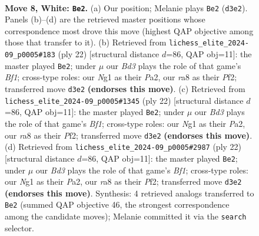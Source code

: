 \documentclass[11pt]{article}
\begin{document}
\begin{figure}[p]\centering
\begin{subfigure}{0.46\textwidth}\centering
\resizebox{\linewidth}{!}{%
\newchessgame
\chessboard[
  setfen={r1bqk2r/pp1nbppp/2p2n2/3p2B1/3P4/2NBP3/PP3PPP/R2QK1NR w KQkq - 2 8},
  showmover=false,
  pgfstyle=straightmove, color=movearrow, markmove={d3-e2}
]}
\caption{}
\end{subfigure}\hfill
\begin{subfigure}{0.46\textwidth}\centering
\resizebox{\linewidth}{!}{%
\newchessgame
\chessboard[
  setfen={2rqkb1r/1p1n1pp1/p2p1n2/3Pp2p/8/2N1B2P/PPP2PP1/R2QKB1R w KQk - 3 12},
  showmover=false,
  pgfstyle=straightmove, color=movearrow, markmove={f1-e2}
]}
\caption{}
\end{subfigure}
\\[4pt]
\begin{subfigure}{0.46\textwidth}\centering
\resizebox{\linewidth}{!}{%
\newchessgame
\chessboard[
  setfen={2rqkb1r/1p1n1pp1/p2p1n2/3Pp2p/8/2N1B2P/PPP2PP1/R2QKB1R w KQk - 3 12},
  showmover=false,
  pgfstyle=straightmove, color=movearrow, markmove={f1-e2}
]}
\caption{}
\end{subfigure}\hfill
\begin{subfigure}{0.46\textwidth}\centering
\resizebox{\linewidth}{!}{%
\newchessgame
\chessboard[
  setfen={2rqkb1r/1p1n1pp1/p2p1n2/3Pp2p/8/2N1B2P/PPP2PP1/R2QKB1R w KQk - 3 12},
  showmover=false,
  pgfstyle=straightmove, color=movearrow, markmove={f1-e2}
]}
\caption{}
\end{subfigure}
\caption{\textbf{Move 8, White: \texttt{Be2}.} (a) Our position; Melanie plays \texttt{Be2} (\texttt{d3e2}). Panels (b)--(d) are the retrieved master positions whose correspondence most drove this move (highest QAP objective among those that transfer to it). (b) Retrieved from \texttt{lichess\_elite\_2024-09\_p0005\#183} (ply 22) [structural distance $d$=86, QAP obj=11]: the master played \texttt{Be2}; under $\mu$ our \emph{Bd3} plays the role of that game's \emph{Bf1}; cross-type roles: our \emph{N}g1 as their \emph{P}a2, our \emph{r}a8 as their \emph{P}f2; transferred move \texttt{d3e2} \textbf{(endorses this move)}. (c) Retrieved from \texttt{lichess\_elite\_2024-09\_p0005\#1345} (ply 22) [structural distance $d$=86, QAP obj=11]: the master played \texttt{Be2}; under $\mu$ our \emph{Bd3} plays the role of that game's \emph{Bf1}; cross-type roles: our \emph{N}g1 as their \emph{P}a2, our \emph{r}a8 as their \emph{P}f2; transferred move \texttt{d3e2} \textbf{(endorses this move)}. (d) Retrieved from \texttt{lichess\_elite\_2024-09\_p0005\#2987} (ply 22) [structural distance $d$=86, QAP obj=11]: the master played \texttt{Be2}; under $\mu$ our \emph{Bd3} plays the role of that game's \emph{Bf1}; cross-type roles: our \emph{N}g1 as their \emph{P}a2, our \emph{r}a8 as their \emph{P}f2; transferred move \texttt{d3e2} \textbf{(endorses this move)}. Synthesis: 4 retrieved analogs transferred to \texttt{Be2} (summed QAP objective 46, the strongest correspondence among the candidate moves); Melanie committed it via the \texttt{search} selector.}
\label{fig:thought-m14}
\end{figure}
\end{document}
